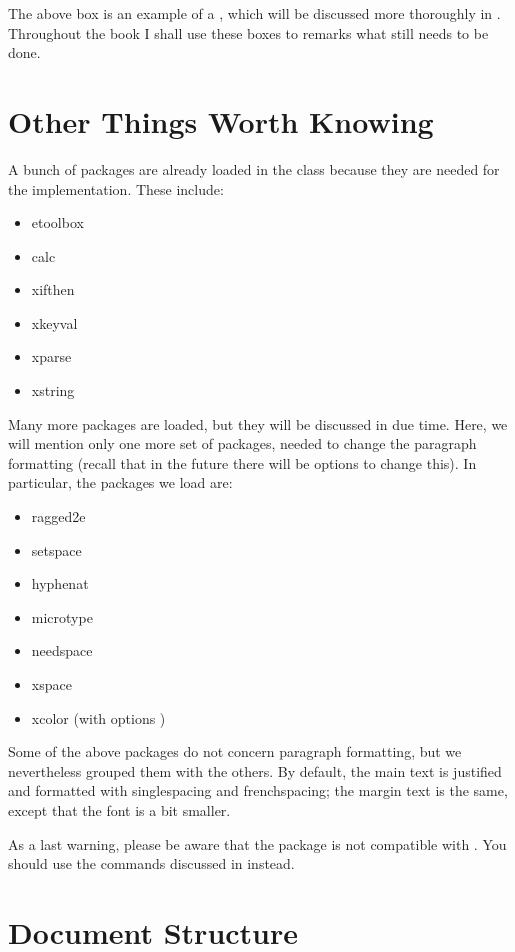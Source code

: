 The above box is an example of a , which will be 
discussed more thoroughly in . Throughout the book I 
shall use these boxes to remarks what still needs to be done.

\section{Other Things Worth Knowing}

A bunch of packages are already loaded in the class because they are 
needed for the implementation. These include:

\begin{itemize}
	\item etoolbox
	\item calc
	\item xifthen
	\item xkeyval
	\item xparse
	\item xstring
\end{itemize}

Many more packages are loaded, but they will be discussed in due time. 
Here, we will mention only one more set of packages, needed to change 
the paragraph formatting (recall that in the future there will be 
options to change this). In particular, the packages we load are:

\begin{itemize}
	\item ragged2e
	\item setspace
	\item hyphenat
	\item microtype
	\item needspace
	\item xspace
	\item xcolor (with options )
\end{itemize}

Some of the above packages do not concern paragraph formatting, but we 
nevertheless grouped them with the others. By default, the main text is 
justified and formatted with singlespacing and frenchspacing; the margin 
text is the same, except that the font is a bit smaller.

As a last warning, please be aware that the  package 
is not compatible with . You should use the commands 
discussed in  instead.

\section{Document Structure}

